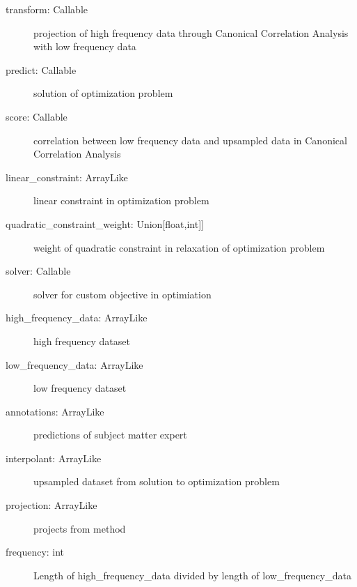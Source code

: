 \documentclass[letterpaper,10pt,english]{sphinxmanual}
\begin{document}
\begin{fulllineitems}
\begin{description}
\item[{transform: Callable }] \leavevmode
\sphinxAtStartPar
projection of high frequency data through Canonical Correlation Analysis with low frequency data

\item[{predict: Callable}] \leavevmode
\sphinxAtStartPar
solution of optimization problem

\item[{score: Callable}] \leavevmode
\sphinxAtStartPar
correlation between low frequency data and up\sphinxhyphen{}sampled data in Canonical Correlation Analysis

\end{description}
\begin{description}
\item[{linear\_constraint: ArrayLike}] \leavevmode
\sphinxAtStartPar
linear constraint in optimization problem

\item[{quadratic\_constraint\_weight: Union{[}float,int{]}{]}}] \leavevmode
\sphinxAtStartPar
weight of quadratic constraint in relaxation of optimization problem

\item[{solver: Callable}] \leavevmode
\sphinxAtStartPar
solver for custom objective in optimiation

\item[{high\_frequency\_data: ArrayLike}] \leavevmode
\sphinxAtStartPar
high frequency dataset

\item[{low\_frequency\_data: ArrayLike}] \leavevmode
\sphinxAtStartPar
low frequency dataset

\item[{annotations: ArrayLike}] \leavevmode
\sphinxAtStartPar
predictions of subject matter expert

\item[{interpolant: ArrayLike}] \leavevmode
\sphinxAtStartPar
up\sphinxhyphen{}sampled dataset from solution to optimization problem

\item[{projection: ArrayLike}] \leavevmode
\sphinxAtStartPar
projects from  method

\item[{frequency: int}] \leavevmode
\sphinxAtStartPar
Length of high\_frequency\_data divided by length of low\_frequency\_data

\end{description}


\end{fulllineitems}
\end{document}
